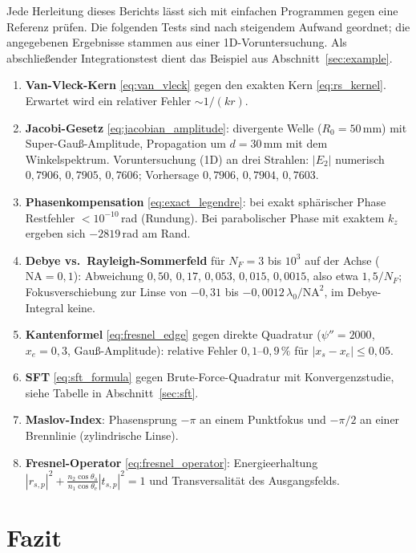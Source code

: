 \documentclass[11pt,a4paper]{scrartcl}
\theoremstyle{insightstyle}
\newcommand{\NA}{\mathrm{NA}}
\begin{document}
Jede Herleitung dieses Berichts lässt sich mit einfachen Programmen gegen eine Referenz prüfen. Die folgenden Tests sind nach steigendem Aufwand geordnet; die angegebenen Ergebnisse stammen aus einer 1D-Voruntersuchung. Als abschließender Integrationstest dient das Beispiel aus Abschnitt~\ref{sec:example}.
\begin{enumerate}
    \item \textbf{Van-Vleck-Kern} \eqref{eq:van_vleck} gegen den exakten Kern \eqref{eq:rs_kernel}. Erwartet wird ein relativer Fehler $\sim1/(kr)$.
    \item \textbf{Jacobi-Gesetz} \eqref{eq:jacobian_amplitude}: divergente Welle ($R_0=50\,$mm) mit Super-Gauß-Amplitude, Propagation um $d=30\,$mm mit dem Winkelspektrum. Voruntersuchung (1D) an drei Strahlen: $|E_2|$ numerisch $0{,}7906$, $0{,}7905$, $0{,}7606$; Vorhersage $0{,}7906$, $0{,}7904$, $0{,}7603$.
    \item \textbf{Phasenkompensation} \eqref{eq:exact_legendre}: bei exakt sphärischer Phase Restfehler $<10^{-10}\,$rad (Rundung). Bei parabolischer Phase mit exaktem $k_z$ ergeben sich $-2819\,$rad am Rand.
    \item \textbf{Debye vs.\ Rayleigh-Sommerfeld} für $N_F=3$ bis $10^3$ auf der Achse ($\NA=0{,}1$): Abweichung $0{,}50$, $0{,}17$, $0{,}053$, $0{,}015$, $0{,}0015$, also etwa $1{,}5/N_F$; Fokusverschiebung zur Linse von $-0{,}31$ bis $-0{,}0012\,\lambda_0/\NA^2$, im Debye-Integral keine.
    \item \textbf{Kantenformel} \eqref{eq:fresnel_edge} gegen direkte Quadratur ($\psi''=2000$, $x_e=0{,}3$, Gauß-Amplitude): relative Fehler $0{,}1$--$0{,}9\,\%$ für $|x_s-x_e|\le0{,}05$.
    \item \textbf{SFT} \eqref{eq:sft_formula} gegen Brute-Force-Quadratur mit Konvergenzstudie, siehe Tabelle in Abschnitt~\ref{sec:sft}.
    \item \textbf{Maslov-Index}: Phasensprung $-\pi$ an einem Punktfokus und $-\pi/2$ an einer Brennlinie (zylindrische Linse).
    \item \textbf{Fresnel-Operator} \eqref{eq:fresnel_operator}: Energieerhaltung $|r_{s,p}|^2+\frac{n_2\cos\theta_\text{a}}{n_1\cos\theta_\text{e}}|t_{s,p}|^2=1$ und Transversalität des Ausgangsfelds.
\end{enumerate}

\section{Fazit}
\end{document}
